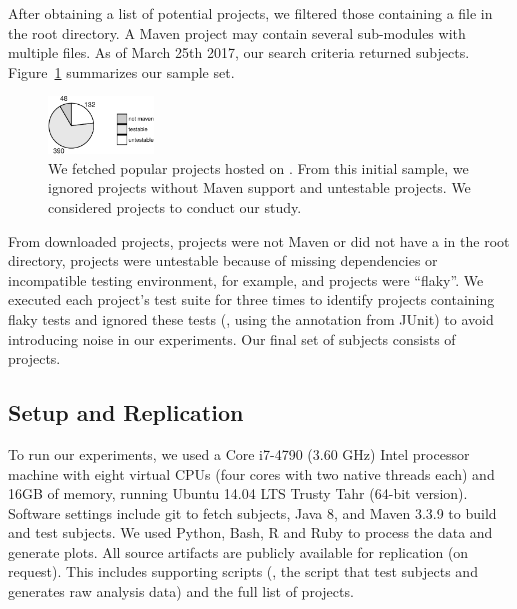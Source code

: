 After obtaining a list of
potential projects, we filtered those containing a \pomf{} file in the
root directory.  A Maven project may contain several sub-modules with
multiple \pomf{} files.
As of March 25th 2017, our search criteria returned \SubjectsGithub{}
subjects. Figure~\ref{fig:subjects} summarizes our sample set. 


\begin{figure}[ht]
    \centering
    \includegraphics[width=0.25\textwidth]{plots/subjs.pdf}
    \caption{\label{fig:subjects}We fetched \SubjectsGithub{} popular
    projects hosted on \github{}. From this initial sample, we ignored
    \SubjectsGithubNotMaven{} projects without Maven support and
    \SubjectsGithubNotTestable{} untestable projects. We considered
    \numSubjs{} projects to conduct our study.}
\end{figure}

From \SubjectsGithub{} downloaded projects, \SubjectsGithubNotMaven{}
projects were not Maven or did not have a \pomf{} in the root
directory, \SubjectsGithubNotTestable{} projects were untestable
because of missing dependencies or incompatible testing environment,
for example, and \SubjectsGithubFlaky{} projects were ``flaky''.
 We executed each project's
test suite for three times to identify projects containing flaky tests
and ignored these tests (\ie, using the  annotation
from JUnit) to avoid introducing noise in our experiments.  Our final
set of subjects consists of \numSubjs{} projects.


\subsection{Setup and Replication}
\label{sec:setup}

To run our experiments, we used a Core i7-4790 (3.60 GHz) Intel
processor machine with eight virtual CPUs (four cores with two native
threads each) and 16GB of memory, running Ubuntu 14.04 LTS Trusty Tahr
(64-bit version).  Software settings include git to fetch
subjects, Java 8, and Maven 3.3.9 to build and test subjects. We used
Python, Bash, R and Ruby to process the
data and generate plots.  All source artifacts are publicly available
for replication (on request).  This
includes supporting scripts (\eg, the script that test subjects and
generates raw analysis data) and the full list of projects. 


